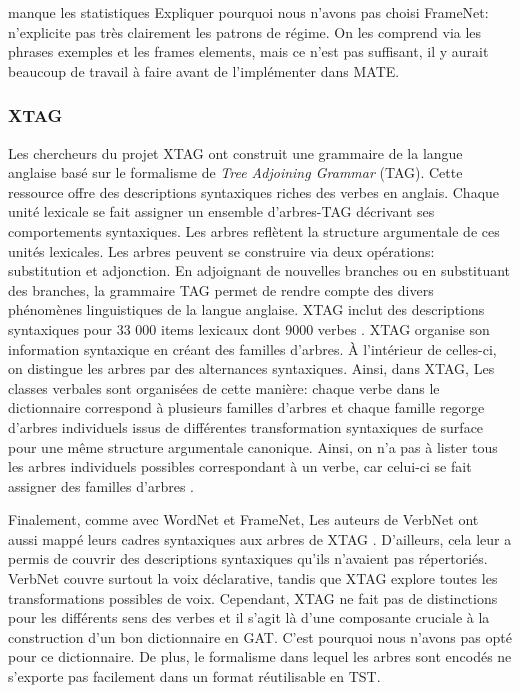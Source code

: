 manque les statistiques
Expliquer pourquoi nous n'avons pas choisi FrameNet: n'explicite pas très clairement les patrons de régime. On les comprend via les phrases exemples et les frames elements, mais ce n'est pas suffisant, il y aurait beaucoup de travail à faire avant de l'implémenter dans MATE.

\subsubsection{XTAG}
Les chercheurs du projet XTAG ont construit une grammaire de la langue anglaise basé sur le formalisme de \emph{Tree Adjoining Grammar} (TAG). Cette ressource offre des descriptions syntaxiques riches des verbes en anglais. Chaque unité lexicale se fait assigner un ensemble d'arbres-TAG décrivant ses comportements syntaxiques. Les arbres reflètent la structure argumentale de ces unités lexicales. Les arbres peuvent se construire via deux opérations: substitution et adjonction. En adjoignant de nouvelles branches ou en substituant des branches, la grammaire TAG permet de rendre compte des divers phénomènes linguistiques de la langue anglaise. XTAG inclut des descriptions syntaxiques pour 33 000 items lexicaux dont 9000 verbes \citep{ResearchGroupLexicalizedTreeAdjoining2001}. XTAG organise son information syntaxique en créant des familles d'arbres. À l'intérieur de celles-ci, on distingue les arbres par des alternances syntaxiques. Ainsi, dans XTAG, Les classes verbales sont organisées de cette manière: chaque verbe dans le dictionnaire correspond à plusieurs familles d'arbres et chaque famille regorge d'arbres individuels issus de différentes transformation syntaxiques de surface pour une même structure argumentale canonique. Ainsi, on n'a pas à lister tous les arbres individuels possibles correspondant à un verbe, car celui-ci se fait assigner des familles d'arbres \citep{DoranXTAGSystemWide1994}.

Finalement, comme avec WordNet et FrameNet, Les auteurs de VerbNet ont aussi mappé leurs cadres syntaxiques aux arbres de XTAG \citep{W04-3326}.
D'ailleurs, cela leur a permis de couvrir des descriptions syntaxiques qu'ils n'avaient pas répertoriés. VerbNet couvre surtout la voix déclarative, tandis que XTAG explore toutes les transformations possibles de voix. Cependant, XTAG ne fait pas de distinctions pour les différents sens des verbes et il s'agit là d'une composante cruciale à la construction d'un bon dictionnaire en GAT. C'est pourquoi nous n'avons pas opté pour ce dictionnaire. De plus, le formalisme dans lequel les arbres sont encodés ne s'exporte pas facilement dans un format réutilisable en TST.

